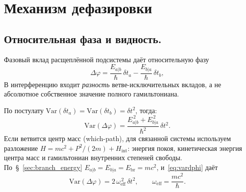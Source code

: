 \documentclass[12pt,a4paper]{article}
\begin{document}
\section{Механизм дефазировки}
\label{sec:decoherence}

\subsection{Относительная фаза и видность.}
Фазовый вклад расщеплённой подсистемы даёт относительную фазу
\begin{equation}
\Delta\varphi=\frac{E_{a|b}}{\hbar}\,\delta t_a-\frac{E_{b|a}}{\hbar}\,\delta t_b,
\label{eq:dphi}
\end{equation}
В интерференцию входит \emph{разность} ветве-исключительных вкладов, а не абсолютное собственное значение полного гамильтониана.

По постулату $\mathrm{Var}(\delta t_a)=\mathrm{Var}(\delta t_b)=\delta t^2$, тогда:
\begin{equation}
\mathrm{Var}(\Delta\varphi)=\frac{E_{a|b}^{\,2}+E_{b|a}^{\,2}}{\hbar^2}\,\delta t^2.
\label{eq:vardphi}
\end{equation}
Если ветвится центр масс (which-path), для связанной системы используем разложение $H = mc^2 + P^2/(2m) + H_{\mathrm{int}}$: энергия покоя, кинетическая энергия центра масс и гамильтониан внутренних степеней свободы. По~\S~\ref{sec:branch_energy} $E_{a|b}=E_{b|a}=E_{\mathrm{br}}=mc^2$, и~\eqref{eq:vardphi} даёт
\begin{equation}
\mathrm{Var}(\Delta\varphi)=2\,\omega_{\mathrm{eff}}^{\,2}\,\delta t^2,
\qquad \omega_{\mathrm{eff}}=\frac{mc^2}{\hbar}.
\end{equation}
\end{document}
